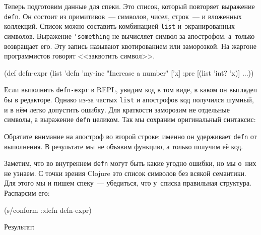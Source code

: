 \fi


Теперь подготовим данные для спеки. Это список, который повторяет выражение
\verb|defn|. Он состоит из примитивов~--- символов, чисел, строк~--- и вложенных
коллекций. Список можно составить комбинацией \verb|list| и~экранированных
символов. Выражение \verb|'something| не вычисляет символ за апострофом,
а~только возвращает его. Эту запись называют квотированием  или
заморозкой. На жаргоне программистов говорят <<заквотить символ>>.

\begin{english}
  \begin{clojure}
(def defn-expr
  (list 'defn 'my-inc
        "Increase a number"
        ['x]
        {:pre [(list 'int? 'x)]} ...))
  \end{clojure}
\end{english}

Если выполнить \verb|defn-expr| в REPL, увидим код в том виде, в каком он
выглядел бы в редакторе. Однако из-за частых \verb|list| и апострофов код
получился шумный, и в нём легко допустить ошибку. Для краткости заморозим не
отдельные символы, а выражение \verb|defn| целиком. Так мы сохраним оригинальный
синтаксис:

\begin{english}
\end{english}

Обратите внимание на апостроф во второй строке: именно он удерживает \verb|defn|
от выполнения. В результате мы не объявим функцию, а только получим её код.

Заметим, что во внутреннем \verb|defn| могут быть какие угодно ошибки, но мы
о~них не узнаем. С точки зрения Clojure это список символов без всякой
семантики. Для этого мы и пишем спеку~--- убедиться, что у~списка правильная
структура. Распарсим его:

\begin{english}
  \begin{clojure}
(s/conform ::defn defn-expr)
  \end{clojure}
\end{english}

\noindent
Результат:

